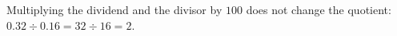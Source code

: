 Multiplying the dividend and the divisor by $100$ does not change the quotient: $0.32\div0.16=32\div16=\boxed{2}$.
